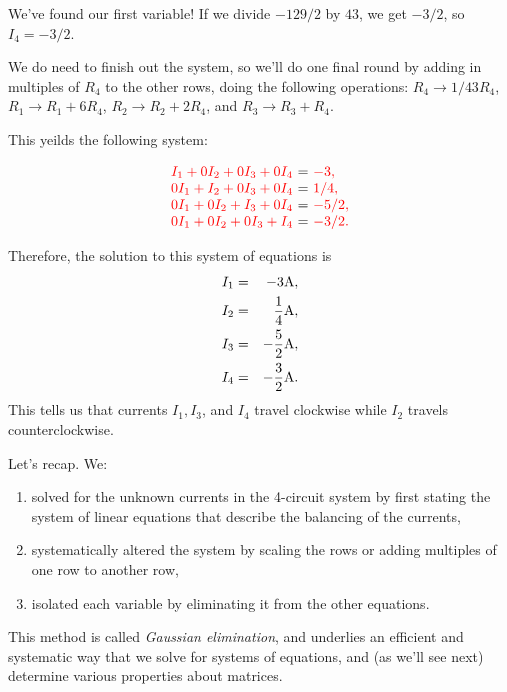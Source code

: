 \documentclass{ximera}
\begin{document}
\begin{example}
\begin{solution}
  We've found our first variable! If we divide $-129/2$ by $43$, we get $-3/2$, so $I_4 = -3/2$.

  We do need to finish out the system, so we'll do one final round by adding in multiples of $R_4$ to the other rows, doing the following operations: $R_4\rightarrow 1/43 R_4$, $R_1 \rightarrow R_1 + 6R_4$, $R_2 \rightarrow R_2 + 2R_4$, and $R_3 \rightarrow R_3 + R_4$.

  This yeilds the following system: 

  \begin{equation*}
    \begin{array}{r@{~}c@{~}l}
      \color{red}I_1+0I_2+0I_3+0I_4&=&\color{red}-3, \\
      \color{red}0I_1+I_2 + 0I_3 +0I_4 &=& \color{red}1/4, \\
      \color{red}0I_1 + 0I_2 + I_3 + 0I_4 &=& \color{red}-5/2, \\
      \color{red}0I_1+0I_2 + 0I_3 + I_4 &=& \color{red}-3/2.
    \end{array}
  \end{equation*}


  Therefore, the solution to this system of equations is
  \begin{eqnarray*}
    I_1 &=& -3 \text{A}, \\
    I_2 &=& \frac{1}{4} \text{A}, \\
    I_3 &=& -\frac{5}{2} \text{A}, \\
    I_4 &=& -\frac{3}{2} \text{A}.
  \end{eqnarray*}
  This tells us that currents $I_1, I_3$, and $I_4$ travel clockwise
  while $I_2$ travels counterclockwise.
\end{solution}

Let's recap. We:

\begin{enumerate}

\item solved for the unknown currents in the 4-circuit system by first stating the system of linear equations that describe the balancing of the currents, 
\item systematically altered the system by scaling the rows or adding multiples of one row to another row, 
\item isolated each variable by eliminating it from the other equations.

\end{enumerate}

This method is called \emph{Gaussian elimination}, and underlies an efficient and systematic way that we solve for systems of equations, and (as we'll see next) determine various properties about matrices. 


\end{example}
\end{document}
